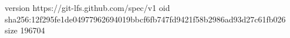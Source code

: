 version https://git-lfs.github.com/spec/v1
oid sha256:12f295fe1de04977962694019bbcf6fb747fd9421f58b2986ad93d27c61fb026
size 196704
